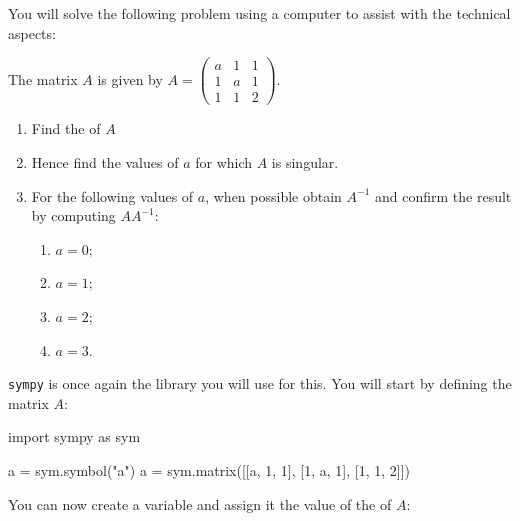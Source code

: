 You will solve the following problem using a computer to assist with the technical aspects:

The matrix \(A\) is given by \(A=\begin{pmatrix}a & 1 & 1\\ 1 & a & 1\\ 1 & 1 & 2\end{pmatrix}\).
\begin{enumerate}

\item 

Find the  of \(A\)

\item 

Hence find the values of \(a\) for which \(A\) is singular.

\item 

For the following values of \(a\), when possible obtain \(A ^ {- 1}\) and confirm
the result by computing \(AA^{-1}\):
\begin{enumerate}

\item 

\(a = 0\);

\item 

\(a = 1\);

\item 

\(a = 2\);

\item 

\(a = 3\).

\end{enumerate}

\end{enumerate}



\texttt{sympy} is once again the library you will use for this.
You will start by defining the matrix \(A\):




\begin{pyin}
import sympy as sym

a = sym.symbol("a")
a = sym.matrix([[a, 1, 1], [1, a, 1], [1, 1, 2]])
\end{pyin}





You can now create a variable \texttt{} and assign it the value of the
 of \(A\):




